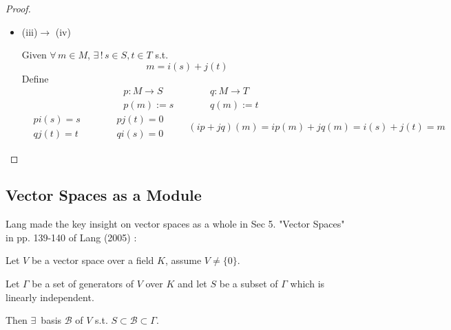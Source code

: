 \begin{proof}
\begin{itemize}
$\forall \, m \in M$, $m=i(s) + j(t)$ for some $s\in S,t\in T$.  

Suppose $\begin{aligned} & \quad \\ 
	& s' \in S \\
& t' \in T \end{aligned}$, s.t. $m=i(s'_ + j(t')$.  
\[
i(s-s') = j(t-t') \in \text{im}(i) \bigcap \text{im}(j) = \lbrace 0 \rbrace
\]
So $s=s',t=t'$, since $i,j$ injective.  
\item (iii)$\to$ (iv)   

Given $\forall \, m \in M$, $\exists \, ! \, s\in S,t\in T$ s.t. 
\[
m=i(s) + j(t)
\]
Define 
\[
\begin{aligned}
	& p:M \to S \\ 
	& p(m) := s
\end{aligned} \qquad \, \begin{aligned}
	& q: M \to T \\ 
	& q(m) := t
\end{aligned}
\]
\[
\begin{aligned}
	& pi(s) = s \\ 
	& qj(t) = t 
\end{aligned} \qquad \, \begin{aligned}
& pj(t) =0  \\
& qi(s) = 0 \end{aligned} \qquad \, 
(ip+jq)(m) = ip(m) + jq(m) = i(s) + j(t) = m 
\]
\end{itemize}
\end{proof}

\subsection{Vector Spaces as a Module}

Lang made the key insight on vector spaces as a whole in Sec 5. "Vector Spaces" in pp. 139-140 of Lang (2005) \cite{agat:Lang2005}: 

\begin{theorem}\label{agat:Thm:ExistenceOfBasisForVectorSpaces}
	Let $V$ be a vector space over a field $K$, assume $V \neq \lbrace 0 \rbrace$. 
	
	Let $\Gamma$ be a set of generators of $V$ over $K$ and let $S$ be a subset of $\Gamma$ which is linearly independent. 
	
	Then $\exists \, $ basis $\mathcal{B}$ of $V$ s.t. $S \subset \mathcal{B} \subset \Gamma$.

\end{theorem}
	
